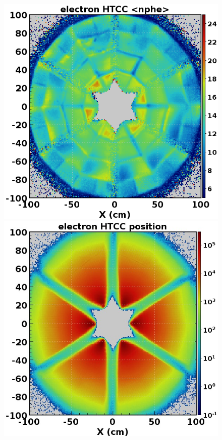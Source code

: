 \documentclass[final,3p,twocolumn]{elsarticle}
\begin{document}
\begin{figure}[t!]
\centerline{\includegraphics[width=1.0\columnwidth]{e_HTCCnphe.png}
\hspace{0.5cm}\includegraphics[width=1.0\columnwidth]{htcc-accept.jpg}}

\end{figure}
\end{document}
